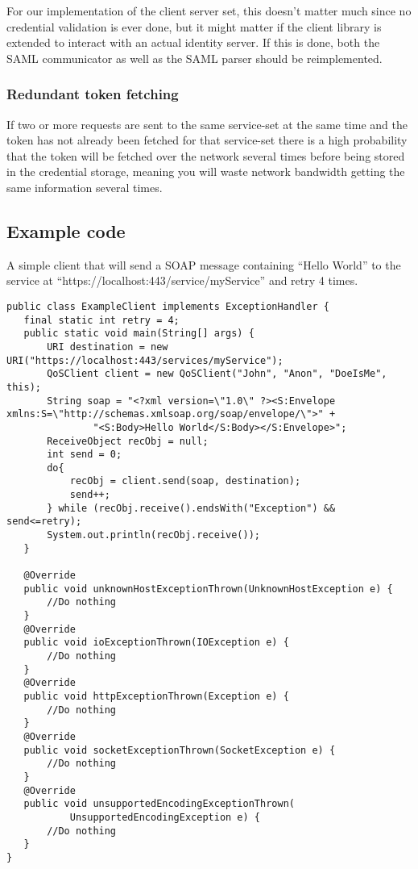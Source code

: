     For our implementation of the client server set, this doesn’t matter much since no credential validation is ever done, but it might matter if the client library is extended to interact with an actual identity server. If this is done, both the SAML communicator as well as the SAML parser should be reimplemented.

    \subsubsection{Redundant token fetching}
    
    If two or more requests are sent to the same service-set at the same time and the token has not already been fetched for that service-set there is a high probability that the token will be fetched over the network several times before being stored in the credential storage, meaning you will waste network bandwidth getting the same information several times.

    \subsection{Example code}\label{userguideExample}

    A simple client that will send a SOAP message containing “Hello World” to the service at “https://localhost:443/service/myService” and retry 4 times.

\lstset{language=java, style=eclipse}
\lstset{frame=single}
\lstset{breaklines=true}
\begin{lstlisting}[caption={A simple example client}, label=userguideExampleclient]
public class ExampleClient implements ExceptionHandler {
   final static int retry = 4;
   public static void main(String[] args) {
       URI destination = new URI("https://localhost:443/services/myService");
       QoSClient client = new QoSClient("John", "Anon", "DoeIsMe", this);
       String soap = "<?xml version=\"1.0\" ?><S:Envelope xmlns:S=\"http://schemas.xmlsoap.org/soap/envelope/\">" +
               "<S:Body>Hello World</S:Body></S:Envelope>";
       ReceiveObject recObj = null;
       int send = 0;
       do{
           recObj = client.send(soap, destination);
           send++;
       } while (recObj.receive().endsWith("Exception") && send<=retry);
       System.out.println(recObj.receive());
   }

   @Override
   public void unknownHostExceptionThrown(UnknownHostException e) {
       //Do nothing
   }
   @Override
   public void ioExceptionThrown(IOException e) {
       //Do nothing
   }
   @Override
   public void httpExceptionThrown(Exception e) {
       //Do nothing    
   }
   @Override
   public void socketExceptionThrown(SocketException e) {
       //Do nothing    
   }
   @Override
   public void unsupportedEncodingExceptionThrown(
           UnsupportedEncodingException e) {
       //Do nothing    
   }
}
\end{lstlisting}
